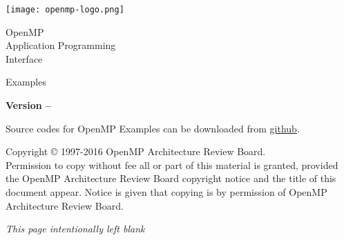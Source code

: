 
  \begin{titlepage}
    \begin{flushleft}
     \hspace{-6em} \texttt{[image: openmp-logo.png]}
    \end{flushleft}

    \begin{adjustwidth}{-0.75in}{0in}
    \begin{center}
      \Huge
      \textsf{OpenMP\\Application Programming\\Interface}

      \vspace{0.5in}\textsf{Examples}\vspace{-0.7in}
      \normalsize

      \vspace{1.0in}

      \textbf{Version \VER{} -- \VERDATE}
    \end{center}
    \end{adjustwidth}

    \vspace{2.3in} %

Source codes for OpenMP \VER{} Examples can be downloaded from
 \href{https://github.com/OpenMP/Examples/tree/v\VER}{github}.\\

\begin{adjustwidth}{0pt}{1em}\setlength{\parskip}{0.25\baselineskip}%
Copyright © 1997-2016 OpenMP Architecture Review Board.\\
Permission to copy without fee all or part of this material is granted,
provided the OpenMP Architecture Review Board copyright notice and
the title of this document appear. Notice is given that copying is by
permission of OpenMP Architecture Review Board.\end{adjustwidth}

  \end{titlepage}


\clearpage
\thispagestyle{empty}
\phantom{a}
\emph{This page intentionally left blank}

\vfill

